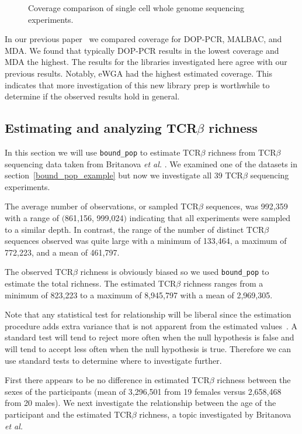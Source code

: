 \documentclass[11pt, titlepage]{article}
\newcommand{\fn}[1]{\texttt{#1}}
\begin{document}
\begin{figure}[h!]
\caption{Coverage comparison of single cell
whole genome sequencing experiments.}
\end{figure}

In our previous paper~\cite{daley2014modeling}
we compared  coverage for DOP-PCR, MALBAC,
and MDA.  We found that typically DOP-PCR results in the
lowest coverage and MDA the highest.
The results for the libraries investigated here
agree with our previous results.
Notably, eWGA had the highest estimated
coverage.  This indicates that more investigation of
this new library prep is worthwhile to determine if the
observed results hold in general.

\newpage

\subsection*{Estimating and analyzing TCR$\beta$ richness}

In this section we will use \fn{bound\_pop}
to estimate TCR$\beta$ richness from TCR$\beta$
sequencing data taken from Britanova {\em et al.}
\cite{britanova2014age}.  We examined one
of the datasets in section~\ref{bound_pop_example}
but now we investigate all 39 TCR$\beta$ sequencing
experiments.

The average number of observations, or sampled
TCR$\beta$ sequences, was 992,359 with a
range of  $($861,156, 999,024$)$
indicating that all experiments were sampled to a similar
depth.
In contrast, the range of the number of distinct TCR$\beta$
sequences observed was quite large with a minimum of
133,464, a maximum of 772,223, and a mean of 461,797.

The observed TCR$\beta$ richness is obviously biased so
we used \fn{bound\_pop} to estimate the total richness.
The estimated TCR$\beta$ richness ranges from a minimum
of 823,223 to a maximum of 8,945,797 with a mean
of 2,969,305.

Note that any statistical test for relationship will be liberal
since the estimation procedure adds extra variance that is not
apparent from the estimated values~\cite{willis2015inference}.
A standard test will tend to reject more often when the
null hypothesis is false and will tend to accept less often
when the null hypothesis is true.
Therefore we can use standard tests to determine
where to investigate further.

First there appears to be no difference in
estimated TCR$\beta$ richness between the sexes
of the participants (mean of 3,296,501 from 19 females
versus 2,658,468 from 20 males).
We next investigate the relationship between the age
of the participant and the estimated TCR$\beta$ richness,
a topic investigated by Britanova {\em et al.}
\end{document}
